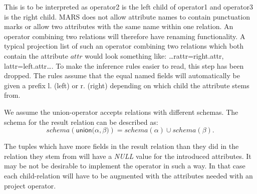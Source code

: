 This is to be interpreted as \textsf{operator2} is the left child of \textsf{operator1} and \textsf{operator3} is
the right child. MARS does not allow attribute names to contain punctuation marks or allow two attributes with the
same name within one relation. An operator combining two relations will therefore have renaming functionality. A
typical projection list of such an operator combining two relations which both contain the attribute $attr$ would
look something like: \textsf{\ldots rattr=right.attr, lattr=left.attr\ldots}. To make the inference rules
easier to read, this step has been dropped. The rules assume that the equal
named fields will automatically be given a prefix \textsf{l.} (left) or
\textsf{r.} (right) depending on which child the attribute stems from.

We assume the \textsf{union}-operator accepts relations with different schemas. The schema for the result
relation can be described as:
\begin{equation*}
schema(\textsf{union(}\alpha, \beta\texttt{)}) = schema(\alpha) \cup schema(\beta).
\end{equation*}

The tuples which have more fields in the result relation than they did in the relation they stem from will
have a \textit{NULL} value for the introduced attributes. It may be not be
desirable to implement the operator in such a way. In that case each
child-relation will have to be augmented with the attributes needed with an \textsf{project} operator.
